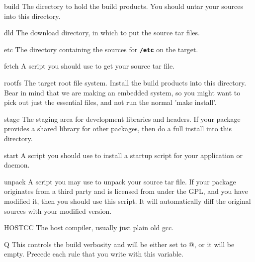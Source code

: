 \documentclass[a4paper,10pt]{article}
\newenvironment{Description}[1][\quad]{%
  \begin{list}{}{%
      \renewcommand{\makelabel}[1]{\textbf{##1}\hfill}%
      \settowidth{\labelwidth}{\textbf{#1}}%
      \setlength{\leftmargin}{\labelwidth+\labelsep}%
  }%
}{%
  \end{list}%
}
\newcommand{\fw}{\tt\bf}
\begin{document}
    \begin{Description}[HOSTCCX]
    \item[build]
      The directory to hold the build products.  You should untar your
      sources into this directory.


    \item[dld]
      The download directory, in which to put the source tar files.

    \item[etc]
      The directory containing the sources for {\fw /etc} on the
      target.

    \item[fetch]
      A script you should use to get your source tar file.


    \item[rootfs]
      The target root file system. Install the build products into
      this directory. Bear in mind that we are making an embedded
      system, so you might want to pick out just the essential files,
      and not run the normal 'make install'.

    \item[stage]
      The staging area for development libraries and headers. If your
      package provides a shared library for other packages, then do a
      full install into this directory.


    \item[start]
      A script you should use to install a startup script for your
      application or daemon.

    \item[unpack]
      A script you may use to unpack your source tar file. If your
      package originates from a third party and is licensed from under
      the GPL, and you have modified it, then you should use this
      script. It will automatically diff the original sources with
      your modified version.

    \item[HOSTCC]
      The host compiler, usually just plain old gcc.

    \item[Q]
      This controls the build verbosity and will be either set to @,
      or it will be empty. Precede each rule that you write with this
      variable.


\end{Description}
\end{document}
